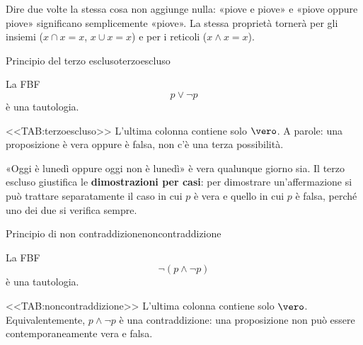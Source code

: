 \begin{spiegazione}
    Dire due volte la stessa cosa non aggiunge nulla: «piove e piove» e «piove oppure piove» significano semplicemente «piove». La stessa proprietà
    tornerà per gli insiemi ($x \cap x = x$, $x \cup x = x$) e per i reticoli ($x \wedge x = x$).
\end{spiegazione}


\begin{concetto}
\begin{Proposizione}{Principio del terzo escluso}{terzoescluso}
    \begin{prerequisiti}
    \end{prerequisiti}
    La FBF
    \[ p \vee \neg p \]
    è una tautologia.
\end{Proposizione}

\begin{dimostrazione}
    <<TAB:terzoescluso>>
    L'ultima colonna contiene solo $\vero$. A parole: una proposizione è vera oppure è falsa, non c'è una terza possibilità.
\end{dimostrazione}
\end{concetto}

\begin{spiegazione}
    «Oggi è lunedì oppure oggi non è lunedì» è vera qualunque giorno sia. Il terzo escluso giustifica le \textbf{dimostrazioni per casi}: per dimostrare
    un'affermazione si può trattare separatamente il caso in cui $p$ è vera e quello in cui $p$ è falsa, perché uno dei due si verifica sempre.
\end{spiegazione}


\begin{concetto}
\begin{Proposizione}{Principio di non contraddizione}{noncontraddizione}
    \begin{prerequisiti}
    \end{prerequisiti}
    La FBF
    \[ \neg(p \wedge \neg p) \]
    è una tautologia.
\end{Proposizione}

\begin{dimostrazione}
    <<TAB:noncontraddizione>>
    L'ultima colonna contiene solo $\vero$. Equivalentemente, $p \wedge \neg p$ è una contraddizione:
    una proposizione non può essere contemporaneamente vera e falsa.
\end{dimostrazione}
\end{concetto}

